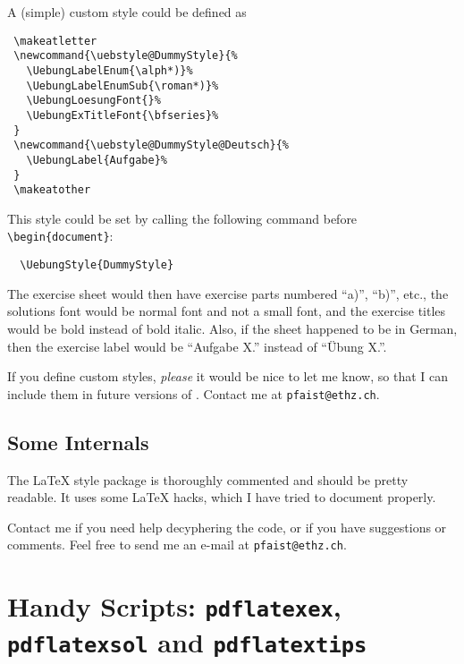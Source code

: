 \documentclass[11pt,a4paper]{article}
\begin{document}
A (simple) custom style could be defined as
\begin{pkgverbatim}
\begin{verbatim}
 \makeatletter
 \newcommand{\uebstyle@DummyStyle}{%
   \UebungLabelEnum{\alph*)}%
   \UebungLabelEnumSub{\roman*)}%
   \UebungLoesungFont{}%
   \UebungExTitleFont{\bfseries}%
 }
 \newcommand{\uebstyle@DummyStyle@Deutsch}{%
   \UebungLabel{Aufgabe}%
 }
 \makeatother
\end{verbatim}
\end{pkgverbatim}

This style could be set by calling the following command before \verb|\begin{document}|:
\begin{pkgverbatim}
\begin{verbatim}
  \UebungStyle{DummyStyle}
\end{verbatim}
\end{pkgverbatim}

The exercise sheet would then have exercise parts numbered ``a)'', ``b)'', etc., the
solutions font would be normal font and not a small font, and the exercise titles would be
bold instead of bold italic. Also, if the sheet happened to be in German, then the
exercise label would be ``Aufgabe X.'' instead of ``\"Ubung X.''.

\begin{pkgnotice}
  If you define custom styles, \emph{please} it would be nice to let me know, so that I
  can include them in future versions of \ethuebung{}. Contact me at
  \texttt{pfaist{@}ethz.ch}.
\end{pkgnotice}






\subsection{Some Internals}
\label{sec:Internals}

The \LaTeX{} style package is thoroughly commented and should be pretty readable. It uses
some \LaTeX{} hacks, which I have tried to document properly.

Contact me if you need help decyphering the code, or if you have suggestions or
comments. Feel free to send me an e-mail at \texttt{pfaist{@}ethz.ch}.


\section{Handy Scripts: \texttt{pdflatexex}, \texttt{pdflatexsol} and \texttt{pdflatextips}}
\label{sec:handyscriptspdflatex}
\end{document}
